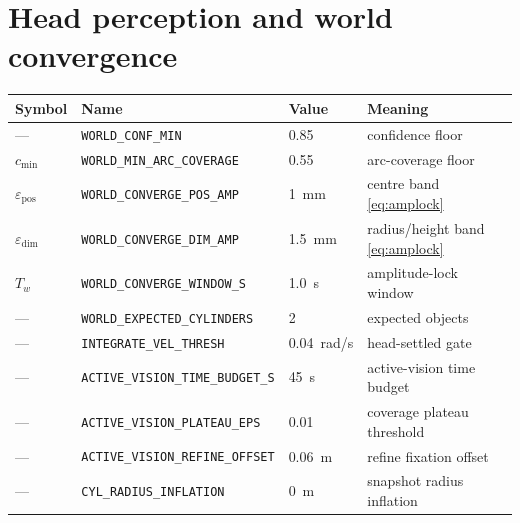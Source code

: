 \documentclass[12pt,a4paper,twoside,openright]{report}
\begin{document}
\section{Head perception and world convergence}
\begin{tabularx}{\linewidth}{@{}lllX@{}}
\toprule
Symbol & Name & Value & Meaning \\
\midrule
--- & \texttt{WORLD\_CONF\_MIN} & 0.85 & confidence floor \\
$c_{\min}$ & \texttt{WORLD\_MIN\_ARC\_COVERAGE} & 0.55 & arc-coverage floor \\
$\varepsilon_{\text{pos}}$ & \texttt{WORLD\_CONVERGE\_POS\_AMP} & 1~mm & centre band \eqref{eq:amplock} \\
$\varepsilon_{\text{dim}}$ & \texttt{WORLD\_CONVERGE\_DIM\_AMP} & 1.5~mm & radius/height band \eqref{eq:amplock} \\
$T_w$ & \texttt{WORLD\_CONVERGE\_WINDOW\_S} & 1.0~s & amplitude-lock window \\
--- & \texttt{WORLD\_EXPECTED\_CYLINDERS} & 2 & expected objects \\
--- & \texttt{INTEGRATE\_VEL\_THRESH} & 0.04~rad/s & head-settled gate \\
--- & \texttt{ACTIVE\_VISION\_TIME\_BUDGET\_S} & 45~s & active-vision time budget \\
--- & \texttt{ACTIVE\_VISION\_PLATEAU\_EPS} & 0.01 & coverage plateau threshold \\
--- & \texttt{ACTIVE\_VISION\_REFINE\_OFFSET} & 0.06~m & refine fixation offset \\
--- & \texttt{CYL\_RADIUS\_INFLATION} & 0~m & snapshot radius inflation \\
\bottomrule
\end{tabularx}
\end{document}
